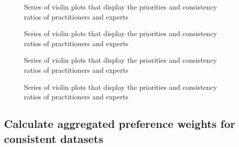 \documentclass [oneside,10pt,a4paper,ngerman,BCOR10mm,headsepline,parindent,final]{scrartcl}
\begin{document}
    \begin{figure}
        \begin{center}\end{center}
        \caption{Series of violin plots that display the priorities and consistency ratios of practitioners and experts}
        \label{fig:violins_PE_attributes}
    \end{figure}
    
    \begin{figure}
        \begin{center}\end{center}
        \caption{Series of violin plots that display the priorities and consistency ratios of practitioners and experts}
        \label{fig:violins_PE_attributes}
    \end{figure}
    
    \begin{figure}
        \begin{center}\end{center}
        \caption{Series of violin plots that display the priorities and consistency ratios of practitioners and experts}
        \label{fig:violins_PE_attributes}
    \end{figure}
    
    \begin{figure}
        \begin{center}\end{center}
        \caption{Series of violin plots that display the priorities and consistency ratios of practitioners and experts}
        \label{fig:violins_PE_attributes}
    \end{figure}
    
    \hypertarget{calculate-aggregated-preference-weights-for-consistent-datasets}{%
\subsection{Calculate aggregated preference weights for consistent
datasets}\label{calculate-aggregated-preference-weights-for-consistent-datasets}}
\end{document}

